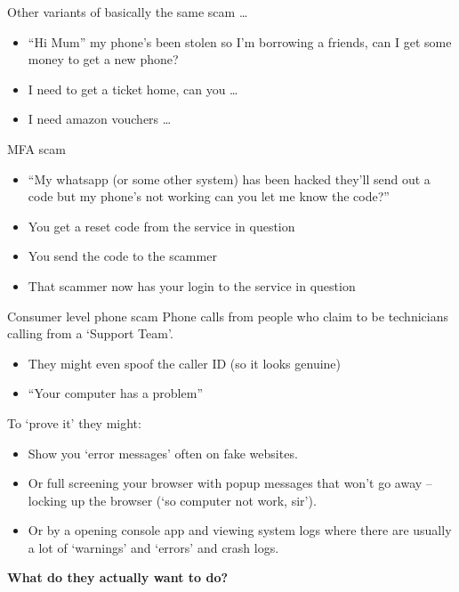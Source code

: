 \documentclass[xcolor=table]{beamer}
\begin{document}
\begin{frame}{Other variants of basically the same scam \ldots}

	\begin{itemize}
		\item ``Hi Mum'' my phone's been stolen so
			I'm borrowing a friends, can I get
			some money to get a new phone?
		\item  I need to get a ticket home, can you \ldots
		\item  I need amazon vouchers \ldots
	\end{itemize}

	\end{frame}
	\begin{frame}{MFA scam}
		\begin{itemize}
				
		\item ``My whatsapp (or some other system) has been hacked they'll
			send out a code but my phone's not
				working can you let me know
			the code?''
		\item You get a reset code from the service in
			question
		\item You send the code to the scammer
		\item That scammer now has your login to the
			service in question
		\end{itemize}
	\end{frame}
\begin{frame}{Consumer level phone scam}
		Phone calls from people who claim to be technicians calling from a `Support Team'. 
	\begin{itemize}
		\item They might even spoof the caller ID {\small(so it looks genuine)}
		\item ``Your computer has a problem''
	\end{itemize}

	To `prove it' they might:
	\begin{itemize}
		\item Show you `error messages' often on fake websites. 
		\item Or full screening your browser with popup messages that won't go away 
		-- locking up the browser {(\small `so computer not work, sir')}.
		\item Or by a opening console app and viewing system logs where there are usually a 
		lot of `warnings' and `errors' and crash logs. 
	\end{itemize}

	{\bf What do they actually want to do?}

\end{frame}
\end{document}
